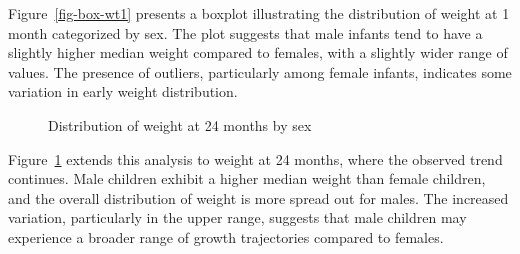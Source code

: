 \documentclass[
  letterpaper,
  DIV=11,
  numbers=noendperiod]{scrartcl}
\begin{document}
Figure~\ref{fig-box-wt1} presents a boxplot illustrating the
distribution of weight at 1 month categorized by sex. The plot suggests
that male infants tend to have a slightly higher median weight compared
to females, with a slightly wider range of values. The presence of
outliers, particularly among female infants, indicates some variation in
early weight distribution.

\begin{figure}


\caption{\label{fig-box-wt24}Distribution of weight at 24 months by sex}

\end{figure}%

Figure~\ref{fig-box-wt24} extends this analysis to weight at 24 months,
where the observed trend continues. Male children exhibit a higher
median weight than female children, and the overall distribution of
weight is more spread out for males. The increased variation,
particularly in the upper range, suggests that male children may
experience a broader range of growth trajectories compared to females.
\end{document}
